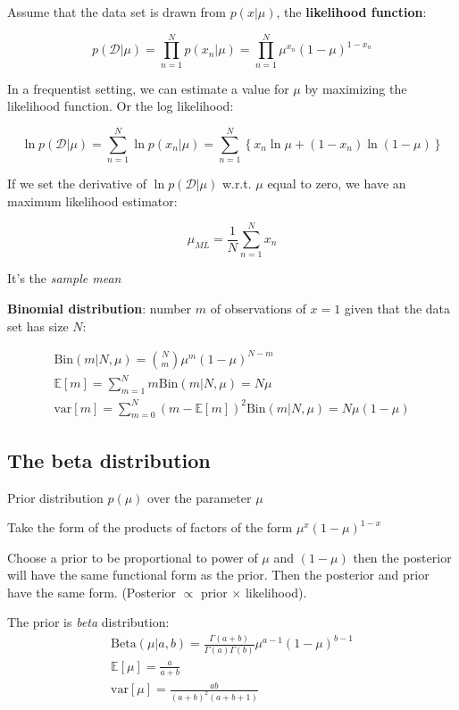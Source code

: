 Assume that the data set is drawn from $p(x|\mu)$, the \textbf{likelihood
function}:

\[ 
    p(\mathcal{D}|\mu) = \prod_{n=1}^N p(x_n|\mu) = \prod_{n=1}^N
    \mu^{x_n}{(1-\mu)}^{1-x_n}
\]

In a frequentist setting, we can estimate a value for $\mu$ by maximizing
the likelihood function. Or the log likelihood:

\[
    \ln p(\mathcal{D}|\mu) = \sum_{n=1}^N \ln p(x_n|\mu) =
    \sum_{n=1}^N\left\{ x_n \ln \mu + (1-x_n)\ln(1-\mu) \right\}
\]

If we set the derivative of $\ln p(\mathcal{D}|\mu)$ w.r.t. $\mu$ equal to
zero, we have an maximum likelihood estimator:

\[
    \mu_{ML} = \frac{1}{N}\sum_{n=1}^N x_n
\]

It's the \emph{sample mean}

\textbf{Binomial distribution}: number $m$ of observations of $x=1$ given that the
data set has size $N$:

\begin{align*}
    \mbox{Bin}(m|N, \mu) = {N \choose m} \mu^m{(1-\mu)}^{N-m} \\
    \mathbb{E}[m] = \sum_{m=1}^N m\mbox{Bin}(m|N, \mu) = N\mu \\
    \mbox{var}[m] = \sum_{m=0}^N {(m -\mathbb{E}[m])}^2 \mbox{Bin}(m|N, \mu) = N \mu (1-\mu)
\end{align*}

\subsection{The beta distribution}
Prior distribution $p(\mu)$ over the parameter $\mu$

Take the form of the products of factors of the form
$\mu^x{(1-\mu)}^{1-x}$

Choose a prior to be proportional to power of $\mu$ and $(1-\mu)$ then the
posterior will have the same functional form as the prior. Then the
posterior and prior have the same form. (Posterior $\propto$ prior
$\times$ likelihood).

The prior is \emph{beta} distribution:
\begin{align*}
    \mbox{Beta}(\mu|a, b) = \frac{\Gamma(a+b)}{\Gamma(a)\Gamma(b)}
    \mu^{a-1}{(1-\mu)}^{b-1} \\
    \mathbb{E}[\mu] = \frac{a}{a+b}\\
    \mbox{var}[\mu] = \frac{ab}{{(a+b)}^2(a+b+1)}
\end{align*}

